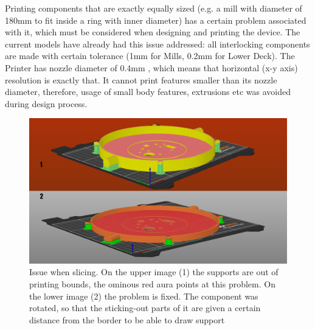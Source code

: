 Printing components that are exactly equally sized (e.g. a mill with diameter of 180mm to fit inside a ring with inner diameter) has a certain problem associated with it, which must be considered when designing and printing the device. The current models have already had this issue addressed: all interlocking components are made with certain tolerance (1mm for Mills, 0.2mm for Lower Deck). The Printer has nozzle diameter of 0.4mm \cite{PrusaMK4Specs}, which means that horizontal (x-y axis) resolution is exactly that. It cannot print features smaller than its nozzle diameter, therefore, usage of small body features, extrusions etc was avoided during design process.
\begin{figure}[b!]
	\centering
	\includegraphics[width=0.7\linewidth]{Figures/Slicer3}
	\caption[Issue when slicing]{Issue when slicing. On the upper image (1) the supports are out of printing bounds, the ominous red aura points at this problem. On the lower image (2) the problem is fixed. The component was rotated, so that the sticking-out parts of it are given a certain distance from the border to be able to draw support}
	\label{fig:slicer3}
\end{figure}


